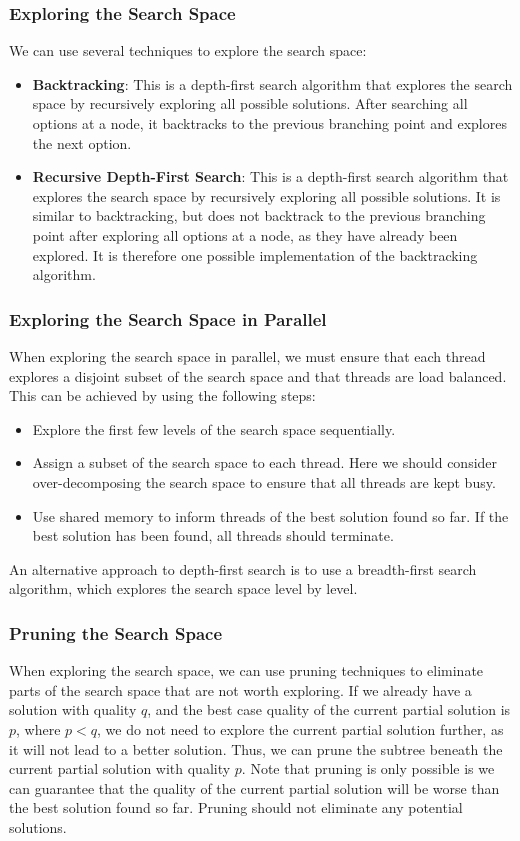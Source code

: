 \documentclass{article}
\begin{document}
\subsubsection{Exploring the Search Space}
We can use several techniques to explore the search space:
\begin{itemize}
    \item \textbf{Backtracking}: This is a depth-first search algorithm
          that explores the search space by recursively exploring all
          possible solutions. After searching all options at a node, it
          backtracks to the previous branching point and explores the
          next option.
    \item \textbf{Recursive Depth-First Search}: This is a depth-first
          search algorithm that explores the search space by recursively
          exploring all possible solutions. It is similar to backtracking,
          but does not backtrack to the previous branching point after
          exploring all options at a node, as they have already been
          explored. It is therefore one possible implementation of
          the backtracking algorithm.
\end{itemize}
\subsubsection{Exploring the Search Space in Parallel}
When exploring the search space in parallel, we must ensure that each
thread explores a disjoint subset of the search space and that threads
are load balanced. This can be achieved by using the following steps:
\begin{itemize}
    \item Explore the first few levels of the search space
          sequentially.
    \item Assign a subset of the search space to each thread. Here we
          should consider over-decomposing the search space to ensure
          that all threads are kept busy.
    \item Use shared memory to inform threads of the best solution
          found so far. If the best solution has been found, all
          threads should terminate.
\end{itemize}
An alternative approach to depth-first search is to use a breadth-first
search algorithm, which explores the search space level by level.
\subsubsection{Pruning the Search Space}
When exploring the search space, we can use pruning techniques to
eliminate parts of the search space that are not worth exploring. If we
already have a solution with quality \(q\), and the best case quality
of the current partial solution is \(p\), where \(p < q\), we do not
need to explore the current partial solution further, as it will not
lead to a better solution. Thus, we can prune the subtree beneath the
current partial solution with quality \(p\). Note that pruning is only
possible is we can guarantee that the quality of the current partial
solution will be worse than the best solution found so far. Pruning
should not eliminate any potential solutions.
\end{document}
